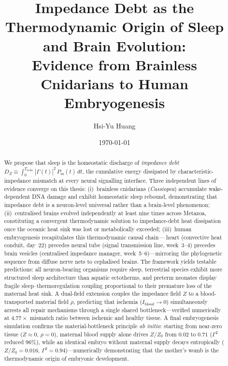 ﻿\documentclass[aps,pre,twocolumn,superscriptaddress,floatfix]{revtex4-2}
\begin{document}
\title{Impedance Debt as the Thermodynamic Origin of Sleep and Brain Evolution:\\
Evidence from Brainless Cnidarians to Human Embryogenesis}

\author{Hsi-Yu Huang}

\date{\today}

\begin{abstract}
We propose that sleep is the homeostatic discharge of \emph{impedance debt}
$D_Z \equiv \int_0^{T_{\mathrm{wake}}} |\Gamma(t)|^2\, P_{\mathrm{in}}(t)\,dt$,
the cumulative energy dissipated by characteristic-impedance mismatch
at every neural signalling interface.
Three independent lines of evidence converge on this thesis:
(i)~brainless cnidarians (\textit{Cassiopea}) accumulate
wake-dependent DNA damage and exhibit homeostatic sleep rebound,
demonstrating that impedance debt is a neuron-level universal
rather than a brain-level phenomenon;
(ii)~centralised brains evolved independently at least nine times
across Metazoa, constituting a convergent thermodynamic solution
to impedance-debt heat dissipation once the oceanic heat sink
was lost or metabolically exceeded;
(iii)~human embryogenesis recapitulates this thermodynamic causal chain---
heart (convective heat conduit, day~22) precedes neural tube
(signal transmission line, week~3--4) precedes brain vesicles
(centralised impedance manager, week~5--6)---mirroring the
phylogenetic sequence from diffuse nerve nets to cephalised brains.
The framework yields testable predictions:
all neuron-bearing organisms require sleep,
terrestrial species exhibit more structured sleep architecture
than aquatic ectotherms,
and preterm neonates display fragile sleep--thermoregulation coupling
proportional to their premature loss of the maternal heat sink.
A dual-field extension couples the impedance field $Z$ to a
blood-transported material field $\rho$, predicting that ischemia
($I_{\mathrm{blood}} \to 0$) simultaneously arrests all repair
mechanisms through a single shared bottleneck---verified numerically
at $4.77\times$ mismatch ratio between ischemic and healthy tissue.
A final embryogenesis simulation confirms the material-bottleneck
principle \emph{ab initio}: starting from near-zero tissue
($Z \approx 0$, $\rho = 0$), maternal blood supply alone
drives $Z/Z_0$ from $0.02$ to $0.71$ ($\Gamma^2$ reduced 96\%),
while an identical embryo without maternal supply decays
entropically ($Z/Z_0 = 0.016$, $\Gamma^2 = 0.94$)---numerically
demonstrating that the mother's womb is the thermodynamic
origin of embryonic development.
\end{abstract}
\end{document}

